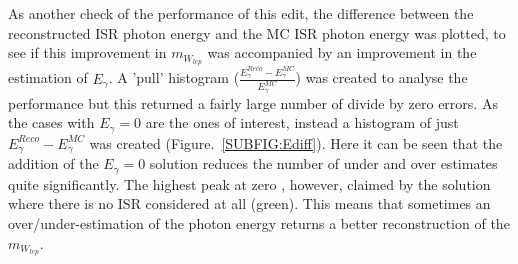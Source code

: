 \\\\
As another check of the  performance of this edit, the difference between the reconstructed ISR photon energy and the MC ISR photon energy was plotted, to see if this improvement in ${m}_{W_{lep}}$ was accompanied by an improvement in the estimation of $E_{\gamma}$. A 'pull' histogram ($\frac{E_{\gamma}^{Reco} - E_{\gamma}^{MC}}{E_{\gamma}^{MC}}$) was created to analyse the performance but this returned a fairly large number of divide by zero errors. As the cases with  $E_{\gamma} = 0$ are the ones of interest, instead a histogram of just $E_{\gamma}^{Reco} - E_{\gamma}^{MC}$ was created (Figure.~\ref{SUBFIG:Ediff}). Here it can be seen that the addition of the $E_{\gamma} = 0$ solution  reduces the number of under and over estimates quite significantly. The highest peak at zero , however, claimed by the solution where there is no ISR considered at all (green). This means that sometimes an over/under-estimation of the photon energy returns a better reconstruction of the ${m}_{W_{lep}}$.

